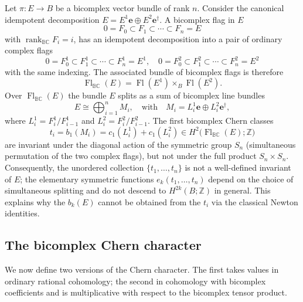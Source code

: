 \documentclass[11pt]{amsart}
\newcommand{\BC}{\mathbb{BC}}       %
\newcommand{\e}{\mathbf{e}}          %
\newcommand{\ed}{\mathbf{e}^\dagger} %
\theoremstyle{definition}
\begin{document}
Let $\pi:E\to B$ be a bicomplex vector bundle of rank $n$. Consider the canonical idempotent decomposition $E=E^1\e\oplus E^2\ed$. A bicomplex flag in $E$
\begin{equation*}
0=F_{0}\subset F_{1}\subset\cdots\subset F_{n}=E
\end{equation*}
with $\operatorname{rank}_{\BC}F_{i}=i$, has an idempotent decomposition into a pair of ordinary complex flags
\begin{equation*}
0=F^{1}_{0}\subset F^{1}_{1}\subset\cdots\subset F^{1}_{n}=E^1,\quad
0=F^{2}_{0}\subset F^{2}_{1}\subset\cdots\subset F^{2}_{n}=E^2
\end{equation*}
with the same indexing.  The associated bundle of bicomplex flags is therefore 
\begin{equation*}
\operatorname{Fl}_{\BC}(E)=\operatorname{Fl}(E^1)\times_B\operatorname{Fl}(E^2).
\end{equation*}
Over $\operatorname{Fl}_{\BC}(E)$ the bundle $E$ splits as a sum of bicomplex line bundles
\begin{equation*}
E\cong\bigoplus_{i=1}^{n}M_{i},\quad\text{with}\quad M_{i}=L^{1}_{i}\e\oplus L^{2}_{i}\ed,
\end{equation*}
where $L^{1}_{i}=F^{1}_{i}/F^{1}_{i-1}$ and $L^{2}_{i}=F^{2}_{i}/F^{2}_{i-1}$.  The first bicomplex Chern classes
\begin{equation*}
t_{i}=b_{1}(M_{i})=c_{1}(L^{1}_{i})+c_{1}(L^{2}_{i})\in H^{2}\bigl(\operatorname{Fl}_{\BC}(E);\mathbb Z\bigr)
\end{equation*}
are invariant under the diagonal action of the symmetric group $S_{n}$ (simultaneous permutation of the two complex flags), but not under the full product $S_{n}\times S_{n}$.  Consequently, the unordered collection $\{t_{1},\dots,t_{n}\}$ is not a well-defined invariant of $E$; the elementary symmetric functions $e_{k}(t_{1},\dots,t_{n})$ depend on the choice of simultaneous splitting and do not descend to $H^{2k}(B;\mathbb Z)$ in general.  This explains why the $b_{k}(E)$ cannot be obtained from the $t_{i}$ via the classical Newton identities.


\subsection{The bicomplex Chern character}

We now define two versions of the Chern character.  The first takes values in ordinary rational cohomology; the second in cohomology with bicomplex coefficients and is multiplicative with respect to the bicomplex tensor product.
\end{document}
